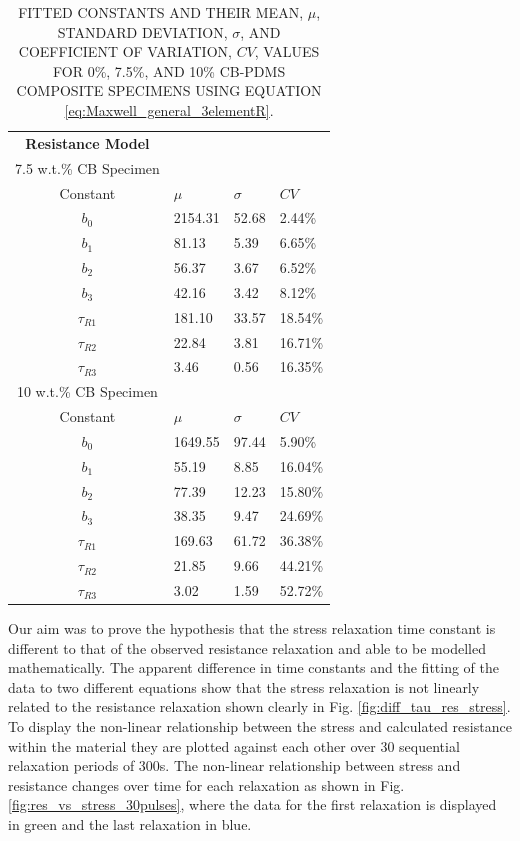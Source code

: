 \begin{table}[H]
	\caption{FITTED CONSTANTS AND THEIR MEAN, $\mu$, STANDARD DEVIATION, $\sigma$, AND COEFFICIENT OF VARIATION, $CV$, VALUES FOR 0\%, 7.5\%, AND 10\% CB-PDMS COMPOSITE SPECIMENS USING EQUATION \ref{eq:Maxwell_general_3elementR}.}
	\begin{center}
		\label{tab:generalised_model_constants}
		\begin{tabular}{c l l l}
			\textbf{Resistance Model} \\
			7.5 w.t.\% CB Specimen \\
			\hline
			Constant & $\mu$ & $\sigma$ & $CV$ \\
			\hline
			$b_0$ & 2154.31 & 52.68 & 2.44\% \\
			$b_1$ & 81.13 & 5.39 & 6.65\% \\
			$b_2$ & 56.37 & 3.67 & 6.52\% \\
			$b_3$ & 42.16 & 3.42 & 8.12\% \\
			$\tau_{R1}$ & 181.10 & 33.57 & 18.54\% \\
			$\tau_{R2}$ & 22.84 & 3.81 & 16.71\% \\
			$\tau_{R3}$ & 3.46 & 0.56 & 16.35\% \\
			\hline
			10 w.t.\% CB Specimen \\
			Constant & $\mu$ & $\sigma$ & $CV$ \\
			\hline
			$b_0$ & 1649.55 & 97.44 & 5.90\% \\
			$b_1$ & 55.19 & 8.85 & 16.04\% \\
			$b_2$ & 77.39 & 12.23 & 15.80\% \\
			$b_3$ & 38.35 & 9.47 & 24.69\% \\
			$\tau_{R1}$ & 169.63 & 61.72 & 36.38\% \\
			$\tau_{R2}$ & 21.85 & 9.66 & 44.21\% \\
			$\tau_{R3}$ & 3.02 & 1.59 & 52.72\% \\
			\hline
		\end{tabular}
	\end{center}
\end{table}
Our aim was to prove the hypothesis that the stress relaxation time constant is different to that of the observed resistance relaxation and able to be modelled mathematically. The apparent difference in time constants and the fitting of the data to two different equations show that the stress relaxation is not linearly related to the resistance relaxation shown clearly in Fig. \ref{fig:diff_tau_res_stress}. To display the non-linear relationship between the stress and calculated resistance within the material they are plotted against each other over 30 sequential relaxation periods of 300s. The non-linear relationship between stress and resistance changes over time for each relaxation as shown in Fig. \ref{fig:res_vs_stress_30pulses}, where the data for the first relaxation is displayed in green and the last relaxation in blue.
